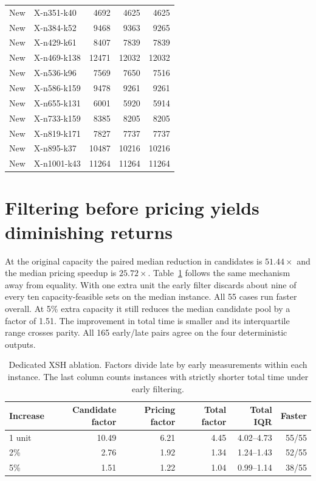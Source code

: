 \documentclass[runningheads]{llncs}
\begin{document}
\begin{longtable}{llrrr}
New & X-n351-k40 & 4692 & 4625 & 4625 \\
New & X-n384-k52 & 9468 & 9363 & 9265 \\
New & X-n429-k61 & 8407 & 7839 & 7839 \\
New & X-n469-k138 & 12471 & 12032 & 12032 \\
New & X-n536-k96 & 7569 & 7650 & 7516 \\
New & X-n586-k159 & 9478 & 9261 & 9261 \\
New & X-n655-k131 & 6001 & 5920 & 5914 \\
New & X-n733-k159 & 8385 & 8205 & 8205 \\
New & X-n819-k171 & 7827 & 7737 & 7737 \\
New & X-n895-k37 & 10487 & 10216 & 10216 \\
New & X-n1001-k43 & 11264 & 11264 & 11264 \\
\end{longtable}\endgroup
\section{Filtering before pricing yields diminishing returns}
At the original capacity the paired median reduction in candidates is $51.44\times$ and the median pricing speedup is $25.72\times$. Table~\ref{tab:ablation} follows the same mechanism away from equality. With one extra unit the early filter discards about nine of every ten capacity-feasible sets on the median instance. All 55 cases run faster overall. At 5\% extra capacity it still reduces the median candidate pool by a factor of 1.51. The improvement in total time is smaller and its interquartile range crosses parity. All 165 early/late pairs agree on the four deterministic outputs.

\begin{table}[tb]\centering
\caption{Dedicated XSH ablation. Factors divide late by early measurements within each instance. The last column counts instances with strictly shorter total time under early filtering.}\label{tab:ablation}
\begin{tabular}{lrrrrr}\toprule
Increase & Candidate factor & Pricing factor & Total factor & Total IQR & Faster\\\midrule
1 unit &10.49&6.21&4.45&4.02--4.73&55/55\\
2\% &2.76&1.92&1.34&1.24--1.43&52/55\\
5\% &1.51&1.22&1.04&0.99--1.14&38/55\\\bottomrule
\end{tabular}
\end{table}
\end{document}
